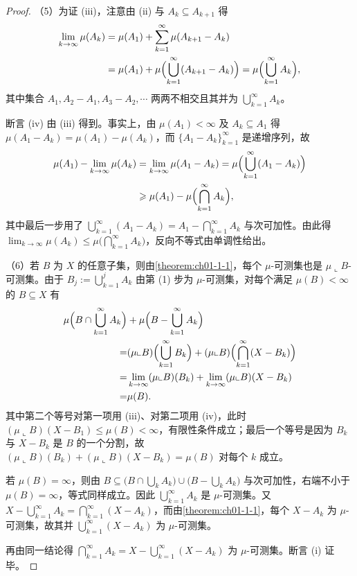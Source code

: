 \documentclass[../../main.tex]{subfiles}
\begin{document}
\begin{proof}
（5）为证 (iii)，注意由 (ii) 与 $A_{k}\subseteq A_{k+1}$ 得
\begin{align*}
\lim_{k\to\infty}\mu(A_{k})&=\mu(A_{1})+\sum_{k=1}^{\infty}\mu(A_{k+1}-A_{k})\\
&=\mu(A_{1})+\mu\Bigl(\bigcup_{k=1}^{\infty}(A_{k+1}-A_{k})\Bigr)=\mu\Bigl(\bigcup_{k=1}^{\infty}A_{k}\Bigr),
\end{align*}
其中集合 $A_{1},A_{2}-A_{1},A_{3}-A_{2},\cdots$ 两两不相交且其并为 $\bigcup_{k=1}^{\infty}A_{k}$。

断言 (iv) 由 (iii) 得到。事实上，由 $\mu(A_{1})<\infty$ 及 $A_{k}\subseteq A_{1}$ 得 $\mu(A_{1}-A_{k})=\mu(A_{1})-\mu(A_{k})$，而 $\{A_{1}-A_{k}\}_{k=1}^{\infty}$ 是递增序列，故
\begin{align*}
\mu(A_{1})-\lim_{k\to\infty}\mu(A_{k})&=\lim_{k\to\infty}\mu(A_{1}-A_{k})=\mu\Bigl(\bigcup_{k=1}^{\infty}(A_{1}-A_{k})\Bigr)\\
&\geqslant\mu(A_{1})-\mu\Bigl(\bigcap_{k=1}^{\infty}A_{k}\Bigr),
\end{align*}
其中最后一步用了 $\bigcup_{k=1}^{\infty}(A_{1}-A_{k})=A_{1}-\bigcap_{k=1}^{\infty}A_{k}$ 与次可加性。由此得 $\lim_{k\to\infty}\mu(A_{k})\leqslant\mu\bigl(\bigcap_{k=1}^{\infty}A_{k}\bigr)$，反向不等式由单调性给出。

（6）若 $B$ 为 $X$ 的任意子集，则由\cref{theorem:ch01-1-1}，每个 $\mu$-可测集也是 $\mu\llcorner B$-可测集。由于 $B_{j}:=\bigcup_{k=1}^{j}A_{k}$ 由第 (1) 步为 $\mu$-可测集，对每个满足 $\mu(B)<\infty$ 的 $B\subseteq X$ 有%
\begin{align*}
\mu\Bigl(B\cap\bigcup_{k=1}^{\infty}A_{k}\Bigr)&+\mu\Bigl(B-\bigcup_{k=1}^{\infty}A_{k}\Bigr)\\
=&(\mu\llcorner B)\Bigl(\bigcup_{k=1}^{\infty}B_{k}\Bigr)+(\mu\llcorner B)\Bigl(\bigcap_{k=1}^{\infty}(X-B_{k})\Bigr)\\
=&\lim_{k\to\infty}(\mu\llcorner B)(B_{k})+\lim_{k\to\infty}(\mu\llcorner B)(X-B_{k})\\
=&\mu(B).
\end{align*}
其中第二个等号对第一项用 (iii)、对第二项用 (iv)，此时 $(\mu\llcorner B)(X-B_{1})\leqslant\mu(B)<\infty$，有限性条件成立；最后一个等号是因为 $B_{k}$ 与 $X-B_{k}$ 是 $B$ 的一个分割，故 $(\mu\llcorner B)(B_{k})+(\mu\llcorner B)(X-B_{k})=\mu(B)$ 对每个 $k$ 成立。

若 $\mu(B)=\infty$，则由 $B\subseteq\bigl(B\cap\bigcup_{k}A_{k}\bigr)\cup\bigl(B-\bigcup_{k}A_{k}\bigr)$ 与次可加性，右端不小于 $\mu(B)=\infty$，等式同样成立。因此 $\bigcup_{k=1}^{\infty}A_{k}$ 是 $\mu$-可测集。又 $X-\bigcup_{k=1}^{\infty}A_{k}=\bigcap_{k=1}^{\infty}(X-A_{k})$，而由\cref{theorem:ch01-1-1}，每个 $X-A_{k}$ 为 $\mu$-可测集，故其并 $\bigcup_{k=1}^{\infty}(X-A_{k})$ 为 $\mu$-可测集。%

再由同一结论得 $\bigcap_{k=1}^{\infty}A_{k}=X-\bigcup_{k=1}^{\infty}(X-A_{k})$ 为 $\mu$-可测集。断言 (i) 证毕。
\end{proof}
\end{document}
